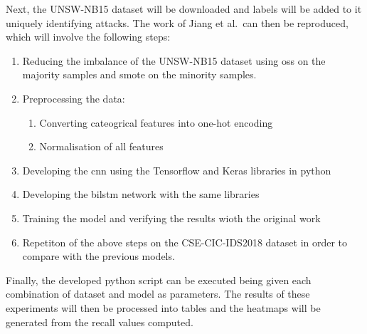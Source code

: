 Next, the UNSW-NB15 dataset will be downloaded and labels will be added to it
uniquely identifying attacks. The work of Jiang et al.\ can then be reproduced,
which will involve the following steps:
\begin{enumerate}
      \item Reducing the imbalance of the UNSW-NB15 dataset using \gls{oss} on the majority
            samples and \gls{smote} on the minority samples.
      \item Preprocessing the data:
            \begin{enumerate}
                  \item Converting cateogrical features into one-hot encoding
                  \item Normalisation of all features
            \end{enumerate}
      \item Developing the \gls{cnn} using the Tensorflow and Keras libraries in python
      \item Developing the \gls{bilstm} network with the same libraries
      \item Training the model and verifying the results wioth the original work
      \item Repetiton of the above steps on the CSE-CIC-IDS2018 dataset in order to compare
            with the previous models.
\end{enumerate}

Finally, the developed python script can be executed being given each
combination of dataset and model as parameters. The results of these
experiments will then be processed into tables and the heatmaps will be
generated from the recall values computed.
